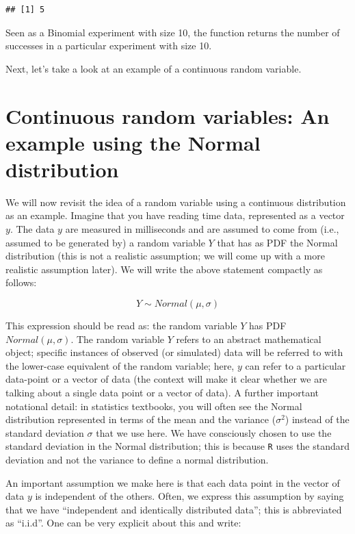 \documentclass[12pt,]{krantz}
\begin{document}
\begin{verbatim}
## [1] 5
\end{verbatim}

Seen as a Binomial experiment with size 10, the function returns the number of successes in a particular experiment with size 10.

Next, let's take a look at an example of a continuous random variable.

\hypertarget{continuous-random-variables-an-example-using-the-normal-distribution}{%
\section{Continuous random variables: An example using the Normal distribution}\label{continuous-random-variables-an-example-using-the-normal-distribution}}

We will now revisit the idea of a random variable using a continuous distribution as an example. Imagine that you have reading time data, represented as a vector \(y\). The data \(y\) are measured in milliseconds and are assumed to come from (i.e., assumed to be generated by) a random variable \(Y\) that has as PDF the Normal distribution (this is not a realistic assumption; we will come up with a more realistic assumption later). We will write the above statement compactly as follows:

\begin{equation}
Y \sim Normal(\mu,\sigma)
\end{equation}

This expression should be read as: the random variable \(Y\) has PDF \(Normal(\mu,\sigma)\). The random variable \(Y\) refers to an abstract mathematical object; specific instances of observed (or simulated) data will be referred to with the lower-case equivalent of the random variable; here, \(y\) can refer to a particular data-point or a vector of data (the context will make it clear whether we are talking about a single data point or a vector of data). A further important notational detail: in statistics textbooks, you will often see the Normal distribution represented in terms of the mean and the variance (\(\sigma^2\)) instead of the standard deviation \(\sigma\) that we use here. We have consciously chosen to use the standard deviation in the Normal distribution; this is because \texttt{R} uses the standard deviation and not the variance to define a normal distribution.

An important assumption we make here is that each data point in the vector of data \(y\) is independent of the others. Often, we express this assumption by saying that we have ``independent and identically distributed data''; this is abbreviated as ``i.i.d''. One can be very explicit about this and write:
\end{document}
